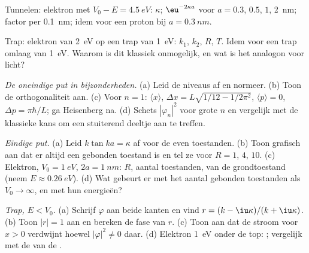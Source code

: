 \begin{exercise}[$\star$]\label{exo:b2:potential-wells-tunneling:3}
Tunnelen: elektron met $V_0 - E = \qty{4.5}{eV}$: $\kappa$; $\eu^{-2\kappa a}$
voor $a = 0.3$, $0.5$, $1$, \qty{2}{nm}; factor per \qty{0.1}{nm}; idem voor
een proton bij $a = \qty{0.3}{nm}$.
\end{exercise}

\begin{exercise}[$\star$]\label{exo:b2:potential-wells-tunneling:4}
Trap: elektron van \qty{2}{eV} op een trap van \qty{1}{eV}: $k_1$, $k_2$,
$R$, $T$. Idem voor een trap omlaag van \qty{1}{eV}. Waarom is dit klassiek
onmogelijk, en wat is het analogon voor licht?
\end{exercise}

\begin{exercise}[$\star\star$]\label{exo:b2:potential-wells-tunneling:5}
\emph{De oneindige put in bijzonderheden.} (a) Leid de niveaus af en normeer.
(b) Toon de orthogonaliteit aan. (c) Voor $n = 1$: $\langle x\rangle$,
$\Delta x =
L\sqrt{1/12 - 1/2\pi^2}$, $\langle p\rangle = 0$,
$\Delta p = \pi\hbar/L$; ga
Heisenberg na. (d) Schets $|\varphi_n|^2$ voor grote $n$ en vergelijk met de
klassieke kans om een stuiterend deeltje aan te treffen.
\end{exercise}

\begin{exercise}[$\star\star$]\label{exo:b2:potential-wells-tunneling:6}
\emph{Eindige put.} (a) Leid $k\tan ka = \kappa$ af voor de even toestanden.
(b) Toon grafisch aan dat er altijd een gebonden toestand is en tel ze voor
$R = 1$, $4$, $10$. (c) Elektron, $V_0 = \qty{1}{eV}$, $2a = \qty{1}{nm}$:
$R$, aantal toestanden,  van de grondtoestand (neem
$E \approx \qty{0.26}{eV}$). (d) Wat gebeurt er met het aantal gebonden toestanden
als $V_0 \to \infty$, en met hun energieën?
\end{exercise}

\begin{exercise}[$\star\star$]\label{exo:b2:potential-wells-tunneling:7}
\emph{Trap, $E < V_0$.} (a) Schrijf $\varphi$ aan beide kanten en vind
$r =
(k - \iu\kappa)/(k + \iu\kappa)$. (b) Toon $|r| = 1$ aan en bereken de
fase
van $r$. (c) Toon aan dat de stroom voor $x > 0$ verdwijnt hoewel
$|\varphi|^2 \ne
0$ daar. (d) Elektron \qty{1}{eV} onder de top:
;
vergelijk met de  van de .
\end{exercise}

